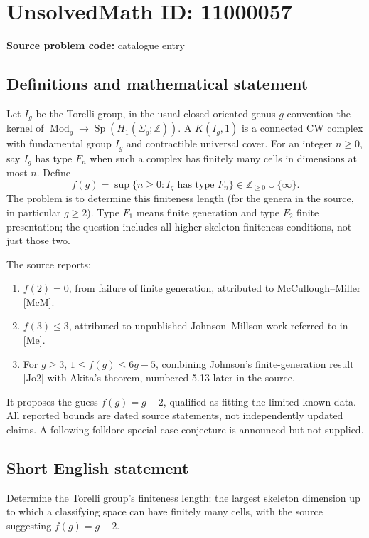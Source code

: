 \documentclass[11pt]{article}
\newcommand{\Z}{\mathbb{Z}}
\begin{document}
\section*{UnsolvedMath ID: 11000057}
\textbf{Source problem code:} catalogue entry
\subsection{Definitions and mathematical statement}
Let \(I_g\) be the Torelli group, in the usual closed oriented genus-\(g\) convention the kernel of \(\operatorname{Mod}_g\to\operatorname{Sp}(H_1(\Sigma_g;\Z))\). A \(K(I_g,1)\) is a connected CW complex with fundamental group \(I_g\) and contractible universal cover. For an integer \(n\geq0\), say \(I_g\) has type \(F_n\) when such a complex has finitely many cells in dimensions at most \(n\). Define
\[
 f(g)=\sup\{n\geq0:I_g\text{ has type }F_n\}\in\Z_{\geq0}\cup\{\infty\}.
\]
The problem is to determine this finiteness length (for the genera in the source, in particular \(g\geq2\)). Type \(F_1\) means finite generation and type \(F_2\) finite presentation; the question includes all higher skeleton finiteness conditions, not just those two.

The source reports:
\begin{enumerate}
\item \(f(2)=0\), from failure of finite generation, attributed to McCullough--Miller [McM].
\item \(f(3)\leq3\), attributed to unpublished Johnson--Millson work referred to in [Me].
\item For \(g\geq3\), \(1\leq f(g)\leq6g-5\), combining Johnson's finite-generation result [Jo2] with Akita's theorem, numbered 5.13 later in the source.
\end{enumerate}
It proposes the guess \(f(g)=g-2\), qualified as fitting the limited known data. All reported bounds are dated source statements, not independently updated claims. A following folklore special-case conjecture is announced but not supplied.
\subsection{Short English statement}
Determine the Torelli group's finiteness length: the largest skeleton dimension up to which a classifying space can have finitely many cells, with the source suggesting \(f(g)=g-2\).
\end{document}
